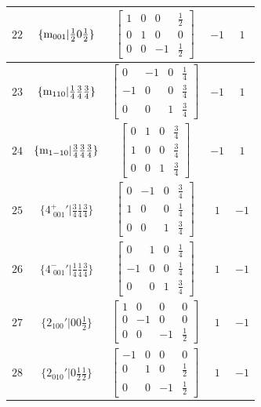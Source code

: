\documentclass[fleqn,8pt]{jsarticle}
\begin{document}
\begin{longtable}{ccccc}
$ 22 $ & $ \{{\rm m}_{001}|\frac{1}{2} 0 \frac{1}{2}\} $ & $ \begin{bmatrix} 1 & 0 & 0 & \frac{1}{2} \\ 0 & 1 & 0 & 0 \\ 0 & 0 & -1 & \frac{1}{2} \end{bmatrix} $ & $ -1 $ & $ 1 $ \\ \hline
$ 23 $ & $ \{{\rm m}_{110}|\frac{1}{4} \frac{3}{4} \frac{3}{4}\} $ & $ \begin{bmatrix} 0 & -1 & 0 & \frac{1}{4} \\ -1 & 0 & 0 & \frac{3}{4} \\ 0 & 0 & 1 & \frac{3}{4} \end{bmatrix} $ & $ -1 $ & $ 1 $ \\ \hline
$ 24 $ & $ \{{\rm m}_{1-10}|\frac{3}{4} \frac{3}{4} \frac{3}{4}\} $ & $ \begin{bmatrix} 0 & 1 & 0 & \frac{3}{4} \\ 1 & 0 & 0 & \frac{3}{4} \\ 0 & 0 & 1 & \frac{3}{4} \end{bmatrix} $ & $ -1 $ & $ 1 $ \\ \hline
$ 25 $ & $ \{4^{+}_{\,\,001}{}'|\frac{3}{4} \frac{1}{4} \frac{3}{4}\} $ & $ \begin{bmatrix} 0 & -1 & 0 & \frac{3}{4} \\ 1 & 0 & 0 & \frac{1}{4} \\ 0 & 0 & 1 & \frac{3}{4} \end{bmatrix} $ & $ 1 $ & $ -1 $ \\ \hline
$ 26 $ & $ \{4^{-}_{\,\,001}{}'|\frac{1}{4} \frac{1}{4} \frac{3}{4}\} $ & $ \begin{bmatrix} 0 & 1 & 0 & \frac{1}{4} \\ -1 & 0 & 0 & \frac{1}{4} \\ 0 & 0 & 1 & \frac{3}{4} \end{bmatrix} $ & $ 1 $ & $ -1 $ \\ \hline
$ 27 $ & $ \{2{}_{100}{}'|0 0 \frac{1}{2}\} $ & $ \begin{bmatrix} 1 & 0 & 0 & 0 \\ 0 & -1 & 0 & 0 \\ 0 & 0 & -1 & \frac{1}{2} \end{bmatrix} $ & $ 1 $ & $ -1 $ \\ \hline
$ 28 $ & $ \{2{}_{010}{}'|0 \frac{1}{2} \frac{1}{2}\} $ & $ \begin{bmatrix} -1 & 0 & 0 & 0 \\ 0 & 1 & 0 & \frac{1}{2} \\ 0 & 0 & -1 & \frac{1}{2} \end{bmatrix} $ & $ 1 $ & $ -1 $ \\ \hline

\end{longtable}
\end{document}
